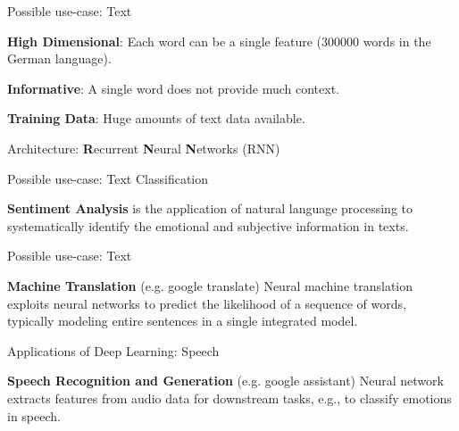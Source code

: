 \documentclass[11pt,compress,t,notes=noshow, xcolor=table]{beamer}
\begin{document}
\begin{framei} {Possible use-case: Text}
\item \textbf{High Dimensional}: Each word can be a single feature (300000 words in the German language).
\item \textbf{Informative}: A single word does not provide much context.
\item \textbf{Training Data}: Huge amounts of text data available.
\centerline{\footnotesize Architecture: \textbf{R}ecurrent \textbf{N}eural \textbf{N}etworks (RNN)}
\end{framei}

\begin{framei} {Possible use-case: Text Classification}
\item \textbf{Sentiment Analysis} is the application of natural language processing to systematically identify the emotional and subjective information in texts.
\vfill
{}

\vfill
\end{framei}

\begin{framei} {Possible use-case: Text}
\item \textbf{Machine Translation} (e.g. google translate) 
Neural machine translation exploits neural networks to predict the likelihood of a sequence of words, typically modeling entire sentences in a single integrated model.
\end{framei}

\begin{framei} {Applications of Deep Learning: Speech}
\item \textbf{Speech Recognition and Generation} (e.g. google assistant)
Neural network extracts features from audio data for downstream tasks, e.g., to classify emotions in speech.
\end{framei}

\endlecture
\end{document}
